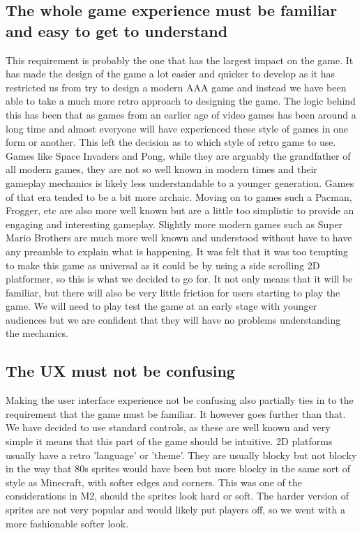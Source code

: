 \documentclass{article}
\begin{document}
\subsection{ The whole game experience must be familiar and easy to get to understand }
This requirement is probably the one that has the largest impact on the game. It has made the design of the game a lot easier and quicker to develop as it has restricted us from try to design a modern AAA game and instead we have been able to take a much more retro approach to designing the game. The logic behind this has been that as games from an earlier age of video games has been around a long time and almost everyone will have experienced these style of games in one form or another. 
This left the decision as to which style of retro game to use. Games like Space Invaders and Pong, while they are arguably the grandfather of all modern games, they are not so well known in modern times and their gameplay mechanics is likely less understandable to a younger generation. Games of that era tended to be a bit more archaic. 
Moving on to games such a Pacman, Frogger, etc are also more well known but are a little too simplistic to provide an engaging and interesting gameplay.
Slightly more modern games such as Super Mario Brothers are much more well known and understood without have to have any preamble to explain what is happening. It was felt that it was too tempting to make this game as universal as it could be by using a side scrolling 2D platformer, so this is what we decided to go for. It not only means that it will be familiar, but there will also be very little friction for users starting to play the game. We will need to play test the game at an early stage with younger audiences but we are confident that they will have no problems understanding the mechanics.
 
\subsection{ The UX must not be confusing }
Making the user interface experience not be confusing also partially ties in to the requirement that the game must be familiar. It however goes further than that. We have decided to use standard controls, as these are well known and very simple it means that this part of the game should be intuitive.
2D platforms usually have a retro 'language' or 'theme'. They are usually blocky but not blocky in the way that 80s sprites would have been but more blocky in the same sort of style as Minecraft, with softer edges and corners. This was one of the considerations in M2, should the sprites look hard or soft. The harder version of sprites are not very popular and would likely put players off, so we went with a more fashionable softer look.
\end{document}
